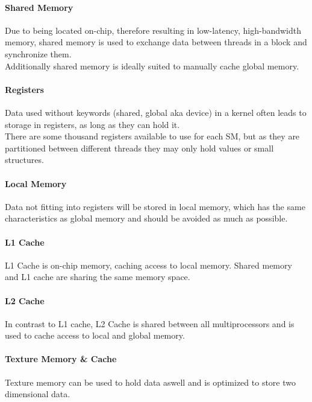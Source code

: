 \paragraph{Shared Memory}
Due to being located on-chip, therefore resulting in low-latency, high-bandwidth memory, shared memory is used to exchange data between threads in a block and synchronize them.\\
Additionally shared memory is ideally suited to manually cache global memory.\\
\paragraph{Registers}
Data used without keywords (shared, global aka device) in a kernel often leads to storage in registers, as long as they can hold it.\\
There are some thousand registers available to use for each SM, but as they are partitioned between different threads they may only hold values or small structures.\\
\paragraph{Local Memory}
Data not fitting into registers will be stored in local memory, which has the same characteristics as global memory and should be avoided as much as possible.\\
\paragraph{L1 Cache}
L1 Cache is on-chip memory, caching access to local memory. Shared memory and L1 cache are sharing the same memory space. \\
\paragraph{L2 Cache}
In contrast to L1 cache, L2 Cache is shared between all multiprocessors and is used to cache access to local and global memory.\\
\paragraph{Texture Memory \& Cache}
Texture memory can be used to hold data aswell and is optimized to store two dimensional data.\\

